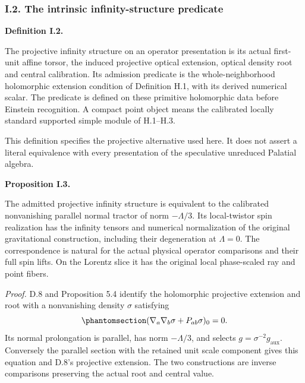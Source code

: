 \documentclass[
  english,
  11pt,
  reqno]{amsart}
\makeatletter
\newcommand{\pandocstatementheading}[1]{%
  \par\addpenalty{\@beginparpenalty}%
  \addvspace{.5\baselineskip plus .2\baselineskip minus .2\baselineskip}%
  {\normalfont\bfseries #1\par}%
  \nobreak\@afterindenttrue\@afterheading
}
\makeatother
\begin{document}
\protect{}\label{sec:gg-projective-infinity-structure}

\subsubsection{I.2. The intrinsic infinity-structure
predicate}\label{i.2.-the-intrinsic-infinity-structure-predicate}

\pandocstatementheading{\protect{}\label{def:gg-projective-infinity-structure}Definition I.2.}

The projective infinity structure on an operator presentation is its
actual first-unit affine torsor, the induced projective optical
extension, optical density root and central calibration. Its admission
predicate is the whole-neighborhood holomorphic extension condition of
Definition H.1, with its derived numerical scalar. The predicate is
defined on these primitive holomorphic data before Einstein recognition.
A compact point object means the calibrated locally standard supported
simple module of H.1--H.3.

This definition specifies the projective alternative used here. It does
not assert a literal equivalence with every presentation of the
speculative unreduced Palatial algebra.

\pandocstatementheading{\protect{}\label{prop:gg-geometric-infinity-structure}Proposition I.3.}

The admitted projective infinity structure is equivalent to the
calibrated nonvanishing parallel normal tractor of norm \(-\Lambda/3\).
Its local-twistor spin realization has the infinity tensors and
numerical normalization of the original gravitational construction,
including their degeneration at \(\Lambda=0\). The correspondence is
natural for the actual physical operator comparisons and their full spin
lifts. On the Lorentz slice it has the original local phase-scaled ray
and point fibers.

\emph{Proof.} D.8 and Proposition 5.4 identify the holomorphic
projective extension and root with a nonvanishing density \(\sigma\)
satisfying
\begin{equation}\protect\phantomsection\label{eq:gg-original-infinity-almost-einstein}{
 (\nabla_a\nabla_b\sigma+P_{ab}\sigma)_0=0 .
}\end{equation} Its normal prolongation is parallel, has norm
\(-\Lambda/3\), and selects \(g=\sigma^{-2}g_{\mathrm{aux}}\).
Conversely the parallel section with the retained unit scale component
gives this equation and D.8's projective extension. The two
constructions are inverse comparisons preserving the actual root and
central value.
\end{document}
